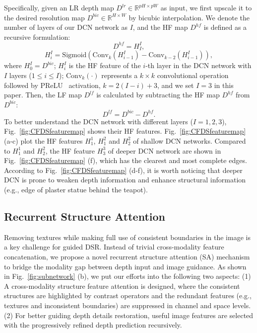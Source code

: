 \documentclass[letterpaper]{article} %
\begin{document}
Specifically, given an LR depth map $D^{lr}\in \mathbb{R}^{pH\times pW}$ as input, we first upscale it to the desired resolution map $D^{bic}\in \mathbb{R}^{H\times W}$ by bicubic interpolation. We denote the number of layers of our DCN network as $I$, and the HF map $D^{hf}$ is defined as a recursive formulation:
\begin{equation}
D^{hf}=H_{I}^I, 
\end{equation}
\begin{equation}
 H_{i}^I=\text{Sigmoid}\left( \text{Conv}_{k} (H_{i-1}^I)-\text{Conv}_{k-2}(H_{i-1}^I) \right),
\end{equation}
where $H_0^I=D^{bic}$; $H_{i}^I$ is the HF feature of the $i$-th layer in the DCN network with $I$ layers ($1\leq i\leq I$); $\text{Conv}_{k}(\cdot)$ represents a $k\times k$ convolutional operation followed by PReLU~\cite{he2015delving} activation, $k =2(I-i)+3$, and we set $I=3$ in this paper. Then, the LF map $D^{lf}$ is calculated by subtracting the HF map $D^{hf}$ from $D^{bic}$:
\begin{equation}
   	 D^{lf}=  D^{bic}-D^{hf}.
\end{equation}
To better understand the DCN network with different layers ($I=1,2,3$), Fig.~\ref{fig:CFDSfeaturemap} shows their HF features. Fig.~\ref{fig:CFDSfeaturemap} (a-c) plot the HF features $H_{1}^1$, $H_{1}^2$ and $H_{2}^2$ of shallow DCN networks. Compared to $H_{1}^1$ and $H_{2}^2$, the HF feature $H_{3}^3$ of deeper DCN network are shown in Fig.~\ref{fig:CFDSfeaturemap} (f), which has the clearest and most complete edges.  According to Fig.~\ref{fig:CFDSfeaturemap} (d-f), it is worth noticing that deeper DCN is prone to weaken depth information and enhance structural information (e.g., edge of plaster statue behind the teapot).



 \subsection{Recurrent Structure Attention}
 \label{sec:CS}

Removing textures while making full use of consistent boundaries in the image is a key challenge for guided DSR. Instead of trivial cross-modality feature concatenation, we propose a novel recurrent structure attention (SA) mechanism to bridge the modality gap between depth input and image guidance.
As shown in Fig.~\ref{fig:subnetwork} (b), we put our efforts into the following two aspects:
(1) A cross-modality structure feature attention is designed, where the consistent structures are highlighted by contrast operators and the redundant features (e.g., textures and inconsistent boundaries) are suppressed in channel and space levels.
(2) For better guiding depth details restoration, useful image features are selected with the progressively refined depth prediction recursively. 
\end{document}
